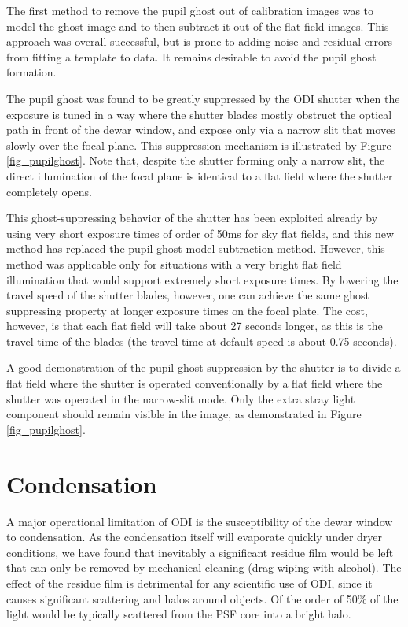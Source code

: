 \documentclass[]{spieman}
\begin{document}
The first method to remove the pupil ghost out of calibration images was to
model the ghost image and to then subtract it out of the flat field images. This
approach was overall successful, but is prone to adding noise and residual
errors from fitting a template to data. It remains desirable to avoid the pupil
ghost formation.

The pupil ghost was found to be greatly suppressed by the ODI shutter when the
exposure is tuned in a way where the shutter blades mostly obstruct the optical
path in front of the dewar window, and expose only via a narrow slit that moves
slowly over the focal plane. This suppression mechanism is illustrated by Figure
\ref{fig_pupilghost}. Note that, despite the shutter forming only a narrow slit,
the direct illumination of the focal plane is identical to a flat field where
the shutter completely opens.

This ghost-suppressing behavior of the shutter has been exploited already by
using very short exposure times of order of 50ms for sky flat fields, and this
new method has replaced the pupil ghost model subtraction method. However,
 this method was applicable only for situations with a very
bright flat field illumination that would support extremely short exposure
times. By lowering the travel speed of the shutter blades, however, one can
achieve the same ghost suppressing property at longer exposure times on the
focal plate. The cost, however, is that each flat field will take about 27
seconds longer, as this is the travel time of the blades (the travel time at
default speed is about 0.75 seconds).

A good demonstration of the pupil ghost suppression by the shutter is to divide
a flat field where the shutter is operated conventionally by a flat field where
the shutter was operated in the narrow-slit mode. Only the extra stray light
component should remain visible in the image, as demonstrated in Figure
\ref{fig_pupilghost}.


\section{Condensation}

A major operational limitation of ODI is the susceptibility of the dewar window
to condensation. As the condensation itself will evaporate quickly under dryer
conditions, we have found that inevitably a significant residue film would be
left that can only be removed by mechanical cleaning (drag wiping with alcohol).
The effect of the residue film is detrimental for any scientific use of ODI,
since it causes significant scattering and halos around objects. Of the order of
50\%  of the light would be typically scattered from the PSF core into a bright
halo.
\end{document}
